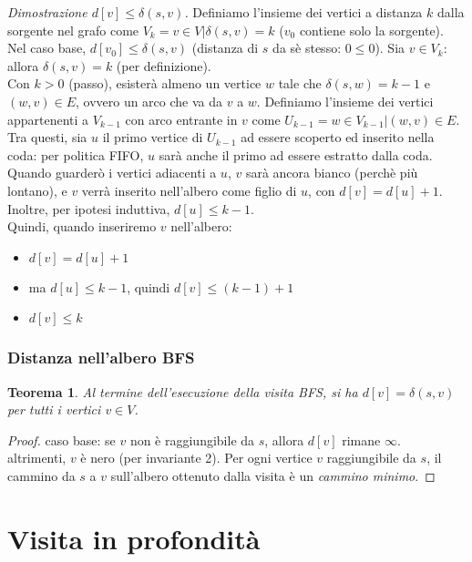 \documentclass[11pt]{book}
\newtheorem*{theorem}{Teorema}
\begin{document}
\textit{\textit{Dimostrazione $d[v] \leq \delta(s,v)$.}} Definiamo l'insieme dei vertici a distanza $k$ dalla sorgente nel grafo 
come $V_k={v\in V|\delta(s,v)=k}$ ($v_0$ contiene solo la sorgente).\\ Nel caso base, $d[v_0]\leq \delta(s,v)$ (distanza di 
$s$ da sè stesso: $0\leq 0$). Sia $v\in V_k$: allora $\delta(s,v)=k$ (per definizione).\\ Con $k>0$ (passo), esisterà almeno 
un vertice $w$ tale che $\delta(s,w)=k-1$ e $(w,v)\in E$, ovvero un arco che va da $v$ a $w$. Definiamo l'insieme dei vertici 
appartenenti a $V_{k-1}$ con arco entrante in $v$ come $U_{k-1}={w\in V_{k-1}|(w,v)\in E}$. Tra questi, sia $u$ il primo 
vertice di $U_{k-1}$ ad essere scoperto ed inserito nella coda: per politica FIFO, $u$ sarà anche il primo ad essere estratto
dalla coda. Quando guarderò i vertici adiacenti a $u$, $v$ sarà ancora bianco (perchè più lontano), e $v$ verrà inserito 
nell'albero come figlio di $u$, con $d[v]=d[u]+1$. Inoltre, per ipotesi induttiva, $d[u]\leq k-1$.\\
Quindi, quando inseriremo $v$ nell'albero:
\begin{itemize}
    \item $d[v]=d[u]+1$
    \item ma $d[u]\leq k-1$, quindi $d[v]\leq (k-1)+1$
    \item $d[v]\leq k$
\end{itemize}
\subsubsection{Distanza nell'albero BFS}
\begin{theorem}
    Al termine dell'esecuzione della visita BFS, si ha $d[v]=\delta(s,v)$ per tutti i vertici $v\in V$.
\end{theorem}
\begin{proof}
    caso base: se $v$ non è raggiungibile da $s$, allora $d[v]$ rimane $\infty$.\\
    altrimenti, $v$ è nero (per invariante 2). Per ogni vertice $v$ raggiungibile da $s$, il cammino da $s$ a $v$ sull'albero 
    ottenuto dalla visita è un \textit{cammino minimo}.
\end{proof}
\section{Visita in profondità}
\end{document}
